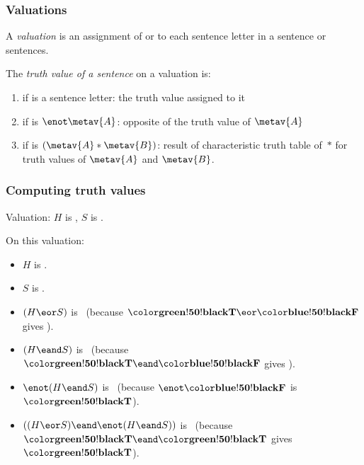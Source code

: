 \begin{frame}
  \frametitle{Valuations}

  \begin{definition}
  A \emph{valuation} is an assignment of \emph{\True} or \emph{\False} to each
  sentence letter in a sentence or sentences.
  \end{definition}

  \begin{definition}
  The \emph{truth value of a sentence}  on a valuation is:
  \begin{enumerate}
  \item if  is a sentence letter: the truth value assigned to
  it
  \item if  is $\enot \metav{A}$: opposite of the truth value of
  $\metav{A}$
  \item if  is $(\metav{A} \ast \metav{B})$:
  result of characteristic truth table of~$\ast$ for truth values of
  $\metav{A}$ and $\metav{B}$.
  \end{enumerate}
  \end{definition}
\end{frame}

\begin{frame}
  \frametitle{Computing truth values}

Valuation: $H$ is \True, $S$ is \False.

On this valuation:

  \begin{itemize}
    \item $H$ is \True.
    \item $S$ is \False.
    \item $(H \eor S)$ is \True\ (because $\True \eor \False$ gives \True).
    \item $(H \eand S)$ is \False\ (because $\True \eand \False$ gives \False).
    \item $\enot (H \eand S)$ is \True\ (because $\enot \False$ is $\True$).
    \item $((H \eor S) \eand \enot (H \eand S))$ is \True\
    (because $\True \eand \True$ gives $\True$).
  \end{itemize}

\end{frame}

